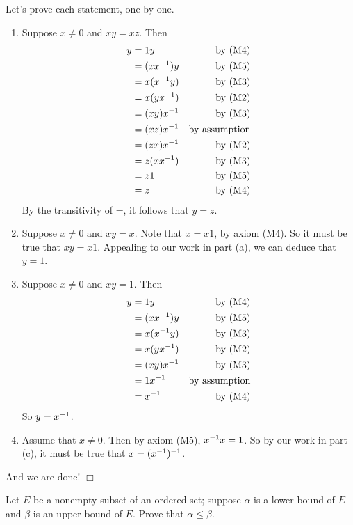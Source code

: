 Let's prove each statement, one by one.
\begin{enumerate}[label=(\alph*)]
    \item %
    Suppose $x \neq 0$ and $xy = xz$.
    Then
    \begin{align*}
        y &= 1y &\text{by (M4)}\\
        &= (xx^{-1}) y &\text{by (M5)}\\
        &= x(x^{-1} y) &\text{by (M3)}\\
        &= x(y x^{-1}) &\text{by (M2)}\\
        &= (xy)x^{-1} &\text{by (M3)}\\
        &= (xz)x^{{-1}} &\text{by assumption}\\
        &= (zx)x^{-1} &\text{by (M2)}\\
        &= z(xx^{-1}) &\text{by (M3)}\\
        &= z1 &\text{by (M5)}\\
        &= z &\text{by (M4)}
    \end{align*}
    By the transitivity of =, it follows that $y=z$.

    
    \item %
    Suppose $x \neq 0$ and $xy = x$.
    Note that $x = x1$, by axiom (M4).
    So it must be true that $xy = x1$.
    Appealing to our work in part (a), we can deduce that $y = 1$.
    
    \item %
    Suppose $x \neq 0$ and $xy = 1$.
    Then
    \begin{align*}
        y &= 1y &\text{by (M4)}\\
        &= (xx^{-1}) y &\text{by (M5)}\\
        &= x(x^{-1} y) &\text{by (M3)}\\
        &= x(yx^{-1}) &\text{by (M2)}\\
        &= (xy)x^{-1} &\text{by (M3)}\\
        &= 1x^{-1} &\text{by assumption}\\
        &= x^{-1} &\text{by (M4)}
    \end{align*}
    So $y = x^{-1}$.
    
    \item %
    Assume that $x \neq 0$.
    Then by axiom (M5), $x^{-1} x = 1$.
    So by our work in part (c), it must be true that $x = (x^{-1})^{-1}$.
\end{enumerate}
And we are done!
$\Box$

\newpage
{}
Let $E$ be a nonempty subset of an ordered set;
suppose $\alpha$ is a lower bound of $E$ and $\beta$ is an upper bound of $E$.
Prove that $\alpha \leq \beta$.

